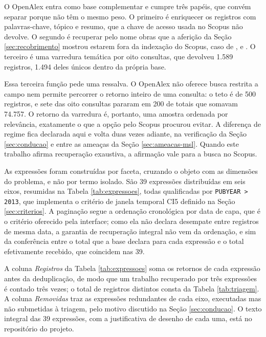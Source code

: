 O OpenAlex entra como base complementar e cumpre três papéis, que convém separar porque não têm o mesmo peso. O primeiro é enriquecer os registros com palavras-chave, tópico e resumo, que a chave de acesso usada no Scopus não devolve. O segundo é recuperar pelo nome obras que a aferição da Seção \ref{sec:recobrimento} mostrou estarem fora da indexação do Scopus, caso de ,  e . O terceiro é uma varredura temática por oito consultas, que devolveu 1.589 registros, 1.494 deles únicos dentro da própria base.

Essa terceira função pede uma ressalva. O OpenAlex não oferece busca restrita a campo nem permite percorrer o retorno inteiro de uma consulta: o teto é de 500 registros, e sete das oito consultas pararam em 200 de totais que somavam 74.757. O retorno da varredura é, portanto, uma amostra ordenada por relevância, exatamente o que a opção pelo Scopus procurou evitar. A diferença de regime fica declarada aqui e volta duas vezes adiante, na verificação da Seção \ref{sec:conducao} e entre as ameaças da Seção \ref{sec:ameacas-msl}. Quando este trabalho afirma recuperação exaustiva, a afirmação vale para a busca no Scopus.

As expressões foram construídas por faceta, cruzando o objeto com as dimensões do problema, e não por termo isolado. São 39 expressões distribuídas em seis eixos, resumidas na Tabela \ref{tab:expressoes}, todas qualificadas por \texttt{PUBYEAR > 2013}, que implementa o critério de janela temporal CI5 definido na Seção \ref{sec:criterios}. A paginação segue a ordenação cronológica por data de capa, que é o critério oferecido pela interface; como ela não declara desempate entre registros de mesma data, a garantia de recuperação integral não vem da ordenação, e sim da conferência entre o total que a base declara para cada expressão e o total efetivamente recebido, que coincidem nas 39.

A coluna \textit{Registros} da Tabela \ref{tab:expressoes} soma os retornos de cada expressão antes da deduplicação, de modo que um trabalho recuperado por três expressões é contado três vezes; o total de registros distintos consta da Tabela \ref{tab:triagem}. A coluna \textit{Removidas} traz as expressões redundantes de cada eixo, executadas mas não submetidas à triagem, pelo motivo discutido na Seção \ref{sec:conducao}. O texto integral das 39 expressões, com a justificativa de desenho de cada uma, está no repositório do projeto.

